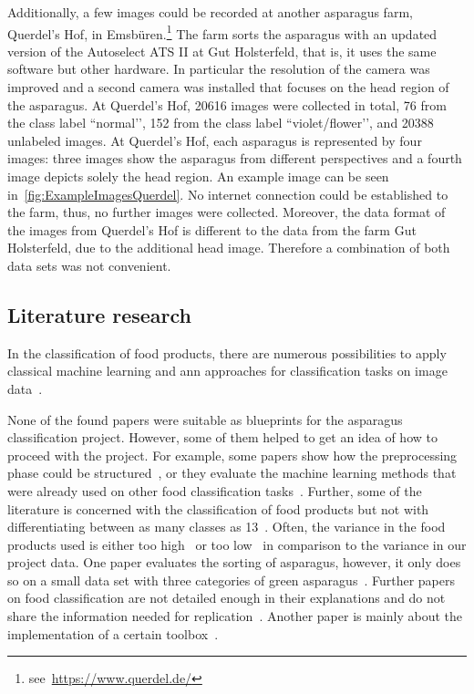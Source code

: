 Additionally, a few images could be recorded at another asparagus farm, Querdel’s Hof, in Emsb{\"u}ren.\footnote{see~\url{https://www.querdel.de/}} The farm sorts the asparagus with an updated version of the Autoselect ATS II at Gut Holsterfeld, that is, it uses the same software but other hardware. In particular the resolution of the camera was improved and a second camera was installed that focuses on the head region of the asparagus. At Querdel’s Hof, 20616 images were collected in total, 76 from the class label ``normal’’, 152 from the class label ``violet/flower’’, and 20388 unlabeled images. At Querdel’s Hof, each asparagus is represented by four images: three images show the asparagus from different perspectives and a fourth image depicts solely the head region. An example image can be seen in~\autoref{fig:ExampleImagesQuerdel}. No internet connection could be established to the farm, thus, no further images were collected. Moreover, the data format of the images from Querdel’s Hof is different to the data from the farm Gut Holsterfeld, due to the additional head image. Therefore a combination of both data sets was not convenient. 


\subsection{Literature research}
\label{sec:Literature}

In the classification of food products, there are numerous possibilities to apply classical machine learning and \acrshort{ann} approaches for classification tasks on image data~\citep{bhargava2018fruits,brosnan2002inspection}.

None of the found papers were suitable as blueprints for the asparagus classification project. However, some of them helped to get an idea of how to proceed with the project. For example, some papers show how the preprocessing phase could be structured~\citep{mery2013automated}, or they evaluate the machine learning methods that were already used on other food classification tasks~\citep{bhargava2018fruits}. Further, some of the literature is concerned with the classification of food products but not with differentiating between as many classes as 13~\citep{diaz2004comparison,kilicc2007classification}. Often, the variance in the food products used is either too high~\citep{zhang2012classification} or too low~\citep{kilicc2007classification,al2011dates} in comparison to the variance in our project data.  One paper evaluates the sorting of asparagus, however, it only does so on a small data set with three categories of green asparagus~\citep{donis2016classification}. Further papers on food classification are not detailed enough in their explanations and do not share the information needed for replication~\citep{pedreschi2016grading}. Another paper is mainly about the implementation of a certain toolbox~\citep{mery2013automated}.

